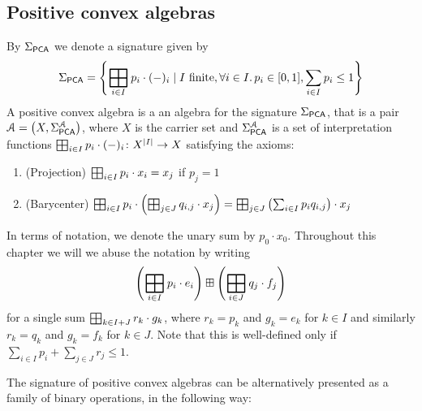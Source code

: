 \subsection{Positive convex algebras}\label{c4:subsec:positive}
By $\Sigma_{{\mathsf{PCA}}}$ we denote a signature given by
$$\sigpca = \left\{\bigboxplus_{i \in I} p_i \cdot (-)_i \mid I \text{ finite}, \forall i \in I \ldotp p_i \in [0,1], \sum_{i \in I} p_i \leq 1\right\} $$
A positive convex algebra is a an algebra for the signature $\Sigma_{{\mathsf{PCA}}}$, that is a pair $\mathcal{A} = \left(X, \Sigma_{{\mathsf{PCA}}}^{\mathcal{A}}\right)$, where $X$ is the carrier set and $\Sigma_{{\mathsf{PCA}}}^{\mathcal{A}}$ is a set of interpretation functions $\bigboxplus_{i \in I} p_i \cdot (-)_i \colon X^{|I|} \to X$ satisfying the axioms:
\begin{enumerate}
    \item (Projection) \(\bigboxplus_{i \in I} p_i \cdot x_i = x_j\) if \(p_j=1\)
    \item (Barycenter) \(\bigboxplus_{i \in I} p_i \cdot \left(\bigboxplus_{j \in J}{q_{i,j}} \cdot {x_j}\right) = \bigboxplus_{j \in J} \left(\sum_{i \in I} p_i q_{i,j} \right) \cdot x_j\)
\end{enumerate}
In terms of notation, we denote the unary sum by $p_0 \cdot x_0$. Throughout this chapter we will we abuse the notation by writing $$\left(\bigboxplus_{i \in I} p_i \cdot e_i\right) \boxplus \left(\bigboxplus_{i \in J} q_j \cdot f_j\right)$$ for a single sum $\bigboxplus_{k \in I + J} r_k \cdot g_k$, where $r_k = p_k$ and $g_k = e_k$ for $k \in I$ and similarly $r_k = q_k$ and $g_k = f_k$ for $k \in J$. Note that this is well-defined only if $\sum_{i \in I} p_i + \sum_{j \in J} r_j \leq 1$.

The signature of positive convex algebras can be alternatively presented as a family of binary operations, in the following way:

